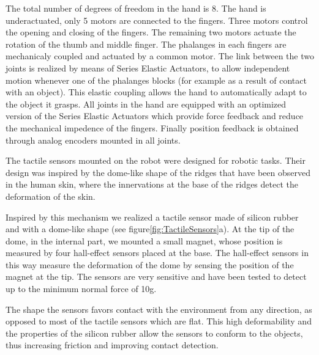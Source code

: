 
The total number of degrees of freedom in the hand is 8. The hand
is underactuated, only 5 motors are connected to the fingers. Three motors control
the opening and closing of the fingers. The remaining two motors actuate
the rotation of the thumb and middle finger. The phalanges in each fingers
are mechanicaly coupled and actuated by a common motor. The link between
the two joints is realized by means of Series
Elastic Actuators, to allow independent motion
whenever one of the phalanges blocks (for example as a result of contact
with an object). This elastic coupling allows the hand to automatically
adapt to the object it grasps. All joints in the hand are equipped with an
optimized version of the Series Elastic Actuators \cite{actuator} which provide
force feedback and reduce the mechanical impedence of the fingers. Finally
position feedback is obtained through analog encoders mounted in all joints.


The tactile sensors mounted on the robot were designed for robotic tasks.
Their design was inspired by the dome-like shape of the ridges that have been
observed in the human skin, where the innervations at the base of the ridges
detect the deformation of the skin.

Inspired by this mechanism we realized a tactile sensor made of
silicon rubber and with a dome-like shape (see
figure\ref{fig:TactileSensors}a). At the tip of the dome, in the
internal part, we mounted a small magnet, whose position is
measured by four hall-effect sensors placed at the base. The
hall-effect sensors in this way measure the deformation of the
dome by sensing the position of the magnet at the tip. The sensors
are very sensitive and have been tested to detect up to the
minimum normal force of 10g.

The shape the sensors favors contact with the environment from any direction,
as opposed to most of the tactile sensors which are flat.
This high deformability and the properties of the silicon rubber allow the
sensors to conform to the objects, thus increasing friction and improving
contact detection.

